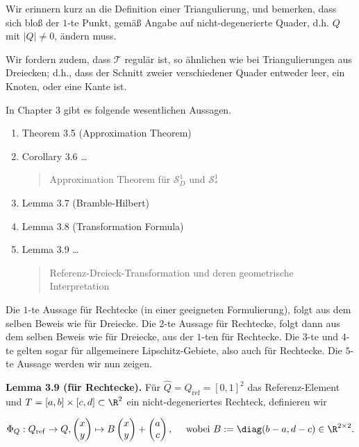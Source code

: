 \begin{solution}

Wir erinnern kurz an die Definition einer Triangulierung, und bemerken, dass sich bloß der $1$-te Punkt, gemäß Angabe auf nicht-degenerierte Quader, d.h. $Q$ mit $|Q| \neq 0$, ändern muss.


Wir fordern zudem, dass $\mathcal{T}$ regulär ist, so ähnlichen wie bei Triangulierungen aus Dreiecken;
d.h., dass der Schnitt zweier verschiedener Quader entweder leer, ein Knoten, oder eine Kante ist.

In Chapter 3 gibt es folgende wesentlichen Aussagen.

\begin{enumerate}[label = \arabic*]
  \item Theorem 3.5 (Approximation Theorem)
  \item Corollary 3.6 \dots \blockquote{Approximation Theorem für $\mathcal{S}_D^1$ und $\mathcal{S}_\ast^1$}
  \item Lemma 3.7 (Bramble-Hilbert)
  \item Lemma 3.8 (Transformation Formula)
  \item Lemma 3.9 \dots \blockquote{Referenz-Dreieck-Transformation und deren geometrische Interpretation}
\end{enumerate}

Die $1$-te Aussage für Rechtecke (in einer geeigneten Formulierung), folgt aus dem selben Beweis wie für Dreiecke.
Die $2$-te Aussage für Rechtecke, folgt dann aus dem selben Beweis wie für Dreiecke, aus der $1$-ten für Rechtecke.
Die $3$-te und $4$-te gelten sogar für allgemeinere Lipschitz-Gebiete, also auch für Rechtecke.
Die $5$-te Aussage werden wir nun zeigen.

\begin{tcolorbox}[standard jigsaw, opacityback = 0]

  \textbf{Lemma 3.9 (für Rechtecke).}
  Für $\hat Q = Q_\mathrm{ref} = [0, 1]^2$ das Referenz-Element und $T = [a, b] \times [c, d] \subset \R^2$ ein nicht-degeneriertes Rechteck, definieren wir

  \begin{align*}
    \Phi_Q:
    Q_\mathrm{ref} \to Q,
    \begin{pmatrix}
      x \\ y
    \end{pmatrix}
    \mapsto
    B
    \begin{pmatrix}
      x \\ y
    \end{pmatrix}
    +
    \begin{pmatrix}
      a \\ c
    \end{pmatrix},
    \quad
    ~\text{wobei}~
    B := \diag(b - a, d - c) \in \R^{2 \times 2}.
  \end{align*}


\end{tcolorbox}
\end{solution}
